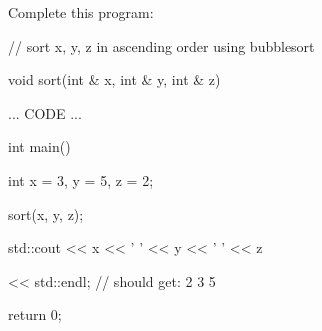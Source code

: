 Complete this program:



\begin{consolethree}[escapeinside=||]

// sort x, y, z in ascending order using bubblesort

void sort(int & x, int & y, int & z)

{

    ... CODE ...

}



int main()

{

    int x = 3, y = 5, z = 2;

    sort(x, y, z);

    std::cout << x << ' ' << y << ' ' << z

              << std::endl; // should get: 2 3 5

    return 0;

}

\end{consolethree}

